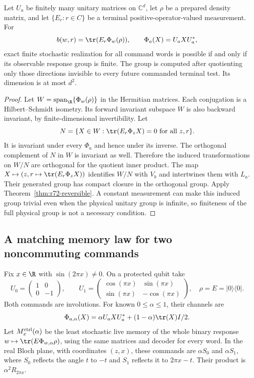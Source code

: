 \begin{corollary}\label{cor:r72-unitary}
Let $U_a$ be finitely many unitary matrices on $\mathbb C^d$, let $\rho$ be a prepared density matrix, and let $\{E_r:r\in C\}$ be a terminal positive-operator-valued measurement. For
\[
 b(w,r)=\tr(E_r\Phi_w(\rho)),\qquad \Phi_a(X)=U_aXU_a^*,
\]
exact finite stochastic realization for all command words is possible if and only if its observable response group is finite. The group is computed after quotienting only those directions invisible to every future commanded terminal test. Its dimension is at most $d^2$.
\end{corollary}
\begin{proof}
Let $W=\operatorname{span}_{\R}\{\Phi_w(\rho)\}$ in the Hermitian matrices. Each conjugation is a Hilbert--Schmidt isometry. Its forward invariant subspace $W$ is also backward invariant, by finite-dimensional invertibility. Let
\[
 N=\{X\in W:\tr(E_r\Phi_zX)=0\text{ for all }z,r\}.
\]
It is invariant under every $\Phi_a$ and hence under its inverse. The orthogonal complement of $N$ in $W$ is invariant as well. Therefore the induced transformations on $W/N$ are orthogonal for the quotient inner product. The map $X\mapsto(z,r\mapsto\tr(E_r\Phi_zX))$ identifies $W/N$ with $V_b$ and intertwines them with $L_a$. Their generated group has compact closure in the orthogonal group. Apply Theorem~\ref{thm:r72-reversible}. A constant measurement can make this induced group trivial even when the physical unitary group is infinite, so finiteness of the full physical group is not a necessary condition.
\end{proof}

\subsection{A matching memory law for two noncommuting commands}
Fix $x\in\R$ with $\sin(2\pi x)\ne0$. On a protected qubit take
\[
 U_0=\begin{pmatrix}1&0\\0&-1\end{pmatrix},\qquad
 U_1=\begin{pmatrix}\cos(\pi x)&\sin(\pi x)\\
                     \sin(\pi x)&-\cos(\pi x)\end{pmatrix},
 \quad \rho=E=|0\rangle\langle0|.
\]
Both commands are involutions. For known $0\le\alpha\le1$, their channels are
\[
 \Phi_{a,\alpha}(X)=\alpha U_aXU_a^*+(1-\alpha)\tr(X)I/2.
\]
Let $M_x^{\rm ctrl}(\alpha)$ be the least stochastic live memory of the whole binary response $w\mapsto\tr(E\Phi_{w,\alpha}\rho)$, using the same matrices and decoder for every word. In the real Bloch plane, with coordinates $(z,x)$, these commands are $\alpha S_0$ and $\alpha S_1$, where $S_0$ reflects the angle $t$ to $-t$ and $S_1$ reflects it to $2\pi x-t$. Their product is $\alpha^2R_{2\pi x}$.

